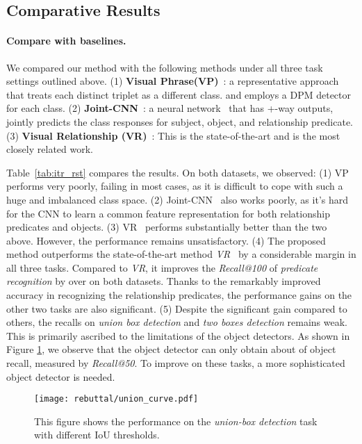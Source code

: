 \subsection{Comparative Results}



\paragraph{Compare with baselines.}

We compared our method with the following methods under all three task settings outlined above.
(1) \textbf{Visual Phrase(VP)}~\cite{sadeghi2011recognition}:
a representative approach that treats each distinct triplet as a different class.
and employs a DPM detector~\cite{lsvm-pami} for each class.
(2) \textbf{Joint-CNN}~\cite{fang2015captions}:
a neural network~\cite{Simonyan14c} that has +-way outputs, jointly predicts the class responses
for subject, object, and relationship predicate.
(3) \textbf{Visual Relationship (VR)}~\cite{lu2016visual}:
This is the state-of-the-art and is the most closely related work.

Table~\ref{tab:itr_rst} compares the results. On both datasets, we observed:
(1) VP~\cite{sadeghi2011recognition} performs very poorly, failing in most cases,
as it is difficult to cope with such a huge and imbalanced class space.
(2) Joint-CNN~\cite{fang2015captions} also works poorly, as
it's hard for the CNN to learn a common feature representation for both
relationship predicates and objects.
(3) VR~\cite{lu2016visual} performs substantially better than the two above.
However, the performance remains unsatisfactory.
(4) The proposed method outperforms the state-of-the-art method \emph{VR}~\cite{lu2016visual} by a considerable margin
in all three tasks.
Compared to \emph{VR}, it improves the \emph{Recall@100} of \emph{predicate recognition} by over  on both datasets.
Thanks to the remarkably improved accuracy in recognizing the relationship predicates,
the performance gains on the other two tasks are also significant.
(5) Despite the significant gain compared to others,
the recalls on \emph{union box detection} and \emph{two boxes detection}
remains weak. This is primarily ascribed to the limitations of the object detectors.
As shown in Figure \ref{fig:iou_relax}, we observe that
the object detector can only obtain about  of object recall, measured by \emph{Recall@50}.
To improve on these tasks, a more sophisticated object detector is needed.

\begin{figure}
	\centering
\texttt{[image: rebuttal/union\_curve.pdf]}
	\caption{\small This figure shows the performance on the \emph{union-box detection} task with different IoU thresholds.}
	\label{fig:iou_relax}
\end{figure}

